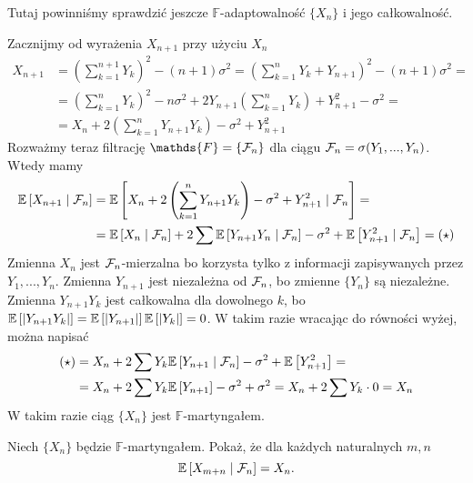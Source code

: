 \begin{solution}
  {\color{red}Tutaj powinniśmy sprawdzić jeszcze $\mathds{F}$-adaptowalność $\{X_n\}$ i jego całkowalność.}

  Zacznijmy od wyrażenia $X_{n+1}$ przy użyciu $X_n$
  \begin{align*}
    X_{n+1}&=\left( \sum_{k=1}^{n+1}Y_{k} \right)^2 - (n+1)\sigma^2= \left( \sum_{k=1}^nY_k +Y_{n+1} \right)^2 - (n+1)\sigma^2=\\ 
           &=\left(\sum_{k=1}^n Y_k \right)^2 -n\sigma ^2 + 2 Y_{n+1}\left( \sum_{k=1}^n Y_k \right) +Y_{n+1}^2 -\sigma^2=\\ 
           &=X_n+2\left( \sum_{k=1}^nY_{n+1}Y_k \right) -\sigma^2 + Y_{n+1}^2
  \end{align*}
  Rozważmy teraz filtrację $\mathds{F}=\{\set{F}_n\}$ dla ciągu $\mathcal{F}_n=\sigma(Y_1,...,Y_n)$. Wtedy mamy
  \begin{align*}
    \expected{X_{n+1}}{\set{F}_n}&=\expected{X_n+2 \left( \sum_{k=1}^nY_{n+1}Y_k \right) -\sigma^2+Y_{n+1}^2}{\set{F}_n}=\\
                                 &=\expected{X_n}{\set{F}_n}+2\sum\expected{Y_{n+1}Y_n}{\set{F}_n}-\sigma^2+\expected{Y_{n+1}^2}{\set{F}_n}=(\star)
  \end{align*}
  Zmienna $X_n$ jest $\mathcal{F}_n$-mierzalna bo korzysta tylko z informacji zapisywanych przez $Y_1,...,Y_n$. Zmienna $Y_{n+1}$ jest niezależna od $\mathcal{F}_n$, bo zmienne $\{Y_n\}$ są niezależne. Zmienna $Y_{n+1}Y_k$ jest całkowalna dla dowolnego $k$, bo $\expected{|Y_{n+1}Y_k|}=\expected{|Y_{n+1}|}\expected{|Y_k|}=0$. W takim razie wracając do równości wyżej, można napisać
  \begin{align*}
    (\star)&=X_n+2\sum Y_{k}\expected{Y_{n+1}}{\set{F}_n}-\sigma^2+\expected{Y_{n+1}^2}=\\ 
           &=X_n+2\sum Y_k\expected{Y_{n+1}}-\sigma^2+\sigma^2=X_n+2\sum Y_k\cdot 0=X_n
  \end{align*}
  W takim razie ciąg $\{X_n\}$ jest $\mathds{F}$-martyngałem.
\end{solution}

\begin{problem}
  Niech $\{X_n\}$ będzie $\mathds{F}$-martyngałem. Pokaż, że dla każdych naturalnych $m,n$
  $$\expected{X_{m+n}}{\set{F}_n}=X_n.$$
\end{problem}

